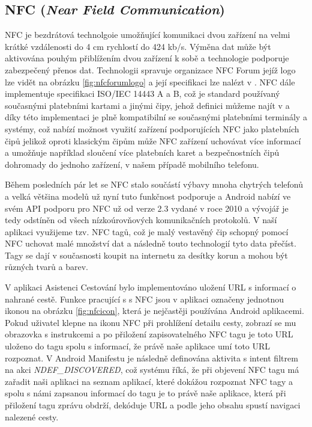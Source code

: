 \documentclass{article}
\begin{document}
\subsection{NFC (\textit{Near Field Communication})}
NFC je bezdrátová technolgoie umožňující komunikaci dvou zařízení na velmi krátké vzdálenosti do 4 cm
rychlostí do 424 kb/s.\cite{nfcforum}  Výměna dat může být aktivována pouhým přiblížením dvou zařízení k sobě
a technologie podporuje zabezpečený přenos dat. Technologii spravuje organizace NFC Forum jejíž logo lze vidět
na obrázku \ref{fig:nfcforumlogo} a její specifikaci lze nalézt v \cite{nfciso}.
NFC dále implementuje specifikaci ISO/IEC 14443 A a B\cite{nfcforum}, což je standard používaný
současnými platebními kartami a jinými čipy, jehož definici můžeme najít v \cite{rfidiso} a díky této
implementaci je plně kompatibilní se současnými platebními terminály a systémy, což nabízí možnost využití zařízení
podporujících NFC jako platebních čipů jelikož oproti klasickým čipům může NFC zařízení uchovávat více informací
a umožňuje například sloučení více platebních karet a bezpečnostních čipů dohromady do jednoho zařízení,
v našem případě mobilního telefonu.

Během posledních pár let se NFC stalo součástí výbavy mnoha chytrých telefonů a velká většina modelů
už nyní tuto funkčnost podporuje a Android nabízí ve svém API podporu pro NFC už od verze 2.3
vydané v roce 2010 a vývojář je tedy odstíněn od všech nízkoúrovňových komunikačních protokolů.
V naší aplikaci využijeme tzv. NFC tagů, což je malý vestavěný čip schopný pomocí NFC uchovat malé množství dat a
následně touto technologií tyto data přečíst. Tagy se dají v současnosti koupit na internetu za desítky
korun a mohou být různých tvarů a barev.

V aplikaci Asistenci Cestování bylo implementováno uložení URL s informací o nahrané cestě. Funkce
pracující s s NFC jsou v aplikaci označeny jednotnou ikonou na obrázku \ref{fig:nfcicon},
která je nejčastěji používána Android aplikacemi.
 Pokud uživatel klepne na ikonu NFC při prohlížení detailu cesty, zobrazí se mu obrazovka s instrukcemi a po přiložení
zapisovatelného NFC tagu je toto URL uloženo do tagu spolu s informací, že právě naše aplikace umí toto URL
rozpoznat. V Android Manifestu je následně definována aktivita s intent filtrem na akci \textit{NDEF\_DISCOVERED},
což systému říká, že při objevení NFC tagu má zařadit naši aplikaci na seznam aplikací, které dokážou
rozpoznat NFC tagy a spolu s námi zapsanou informací do tagu je to právě naše aplikace, která při přiložení
tagu zprávu obdrží, dekóduje URL a podle jeho obsahu spustí navigaci nalezené cesty.
\end{document}

